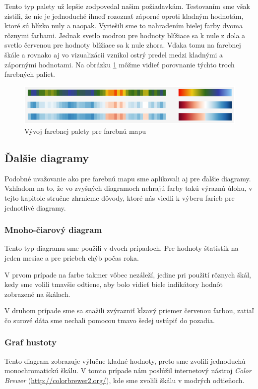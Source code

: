 Tento typ palety už lepšie zodpovedal našim požiadavkám. Testovaním sme však zistili, že nie je jednoduché ihneď rozoznať záporné oproti kladným hodnotám, ktoré sú blízko nuly a naopak. Vyriešili sme to nahradením bielej farby dvoma rôznymi farbami. Jednak svetlo modrou pre hodnoty blížiace sa k nule z dola a svetlo červenou pre hodnoty blížiace sa k nule zhora. Vďaka tomu na farebnej škále a rovnako aj vo vizualizácii vznikol ostrý predel medzi kladnými a zápornými hodnotami. Na obrázku \ref{fig:colorpalettes} môžme vidieť porovnanie týchto troch farebných paliet.


\begin{figure}
	\centering
	\includegraphics[width = 5in]{colorpalettes}
	\caption{Vývoj farebnej palety pre farebnú mapu}
	\label{fig:colorpalettes}
\end{figure}


\subsection{Ďalšie diagramy}
Podobné uvažovanie ako pre farebnú mapu sme aplikovali aj pre ďalšie diagramy. Vzhľadom na to, že vo zvyšných diagramoch nehrajú farby takú výraznú úlohu, v tejto kapitole stručne zhrnieme dôvody, ktoré nás viedli k výberu farieb pre jednotlivé diagramy.

\subsubsection{Mnoho-čiarový diagram} 
Tento typ diagramu sme použili v dvoch prípadoch. Pre hodnoty štatistík na jeden mesiac a pre priebeh chýb počas roka.

V prvom prípade na farbe takmer vôbec nezáleží, jedine pri použití rôznych škál, kedy sme volili tmavšie odtiene, aby bolo vidieť biele indikátory hodnôt zobrazené na škálach.

V druhom prípade sme sa snažili zvýrazniť kĺzavý priemer červenou farbou, zatiaľ čo surové dáta sme nechali pomocou tmavo šedej ustúpiť do pozadia.

\subsubsection{Graf hustoty} 
Tento diagram zobrazuje výlučne kladné hodnoty, preto sme zvolili jednoduchú monochromatickú škálu. V tomto prípade nám poslúžil internetový nástroj \textit{Color Brewer} (\url{http://colorbrewer2.org/}), kde sme zvolili škálu v modrých odtieňoch.


